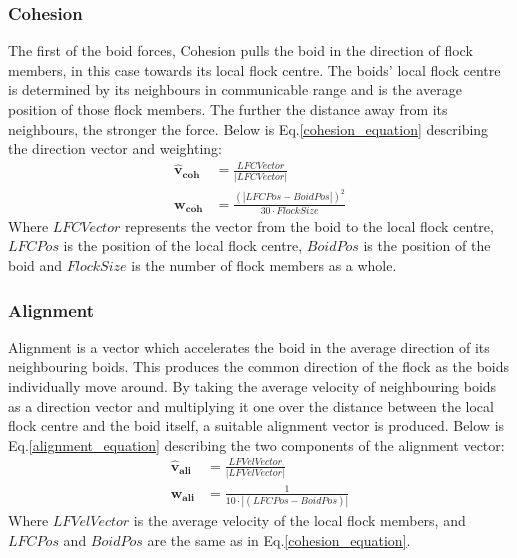 \subsubsection{Cohesion} 
The first of the boid forces, Cohesion pulls the boid in the direction of flock members, in this case towards its local flock centre. The boids' local flock centre is determined by its neighbours in communicable range and is the average position of those flock members. The further the distance away from its neighbours, the stronger the force. Below is Eq.\ref{cohesion_equation} describing the direction vector and weighting:
\begin{equation}
\begin{split}
	\boldsymbol{\hat{v}_{coh}} &= \frac{ LFCVector} {|LFCVector|} \\
	\boldsymbol{w_{coh}} &= \frac{(|LFCPos - BoidPos|)^2} {30 \cdot FlockSize}
\end{split}
\label{cohesion_equation}
\end{equation}
Where $LFCVector$ represents the vector from the boid to the local flock centre, $LFCPos$ is the position of the local flock centre, $BoidPos$ is the position of the boid and $FlockSize$ is the number of flock members as a whole.


\subsubsection{Alignment}
Alignment is a vector which accelerates the boid in the average direction of its neighbouring boids. This produces the common direction of the flock as the boids individually move around. By taking the average velocity of neighbouring boids as a direction vector and multiplying it one over the distance between the local flock centre and the boid itself, a suitable alignment vector is produced. Below is Eq.\ref{alignment_equation} describing the two components of the alignment vector:
\begin{equation}
\begin{split}
	\boldsymbol{\hat{v}_{ali}} &= \frac{ LFVelVector} {|LFVelVector|} \\
	\boldsymbol{w_{ali}} &= \frac{1} {10 \cdot |(LFCPos - BoidPos)|}
\end{split}
\label{alignment_equation}
\end{equation}
Where $LFVelVector$ is the average velocity of the local flock members, and $LFCPos$ and $BoidPos$ are the same as in Eq.\ref{cohesion_equation}.


